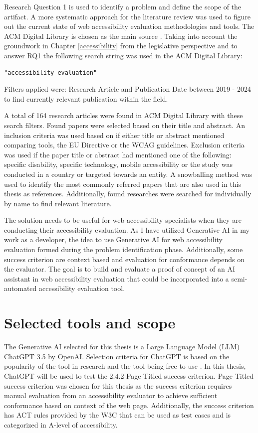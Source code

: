 Research Question 1 is used to identify a problem and define the scope of the artifact. A more systematic approach for the literature review was used to figure out the current state of web accessibility evaluation methodologies and tools. The ACM Digital Library is chosen as the main source . Taking into account the groundwork in Chapter \ref{accessibility} from the legislative perspective and to answer RQ1 the following search string was used in the ACM Digital Library:

\begin{verbatim}
"accessibility evaluation"
\end{verbatim}

Filters applied were: Research Article and Publication Date between 2019 - 2024 to find currently relevant publication within the field. 

A total of 164 research articles were found in ACM Digital Library with these search filters. Found papers were selected based on their title and abstract. An inclusion criteria was used based on if either title or abstract mentioned comparing tools, the EU Directive or the WCAG guidelines. Exclusion criteria was used if the paper title or abstract had mentioned one of the following: specific disability, specific technology, mobile accessibility or the study was conducted in a country or targeted towards an entity. A snowballing method was used to identify the most commonly referred papers that are also used in this thesis as references. Additionally, found researches were searched for individually by name to find relevant literature.

The solution needs to be useful for web accessibility specialists when they are conducting their accessibility evaluation. As I have utilized Generative AI in my work as a developer, the idea to use Generative AI for web accessibility evaluation formed during the problem identification phase. Additionally, some success criterion are context based and evaluation for conformance depends on the evaluator. The goal is to build and evaluate a proof of concept of an AI assistant in web accessibility evaluation that could be incorporated into a semi-automated accessibility evaluation tool.

\section{Selected tools and scope}

The Generative AI selected for this thesis is a Large Language Model (LLM) ChatGPT 3.5 by OpenAI. Selection criteria for ChatGPT is based on the popularity of the tool in research and the tool being free to use \citep{ouyang2023llm, white2023prompt}. In this thesis, ChatGPT will be used to test the 2.4.2 Page Titled success criterion. Page Titled success criterion was chosen for this thesis as the success criterion requires manual evaluation from an accessibility evaluator to achieve sufficient conformance based on context of the web page. Additionally, the success criterion has ACT rules provided by the W3C that can be used as test cases and is categorized in A-level of accessibility. 

